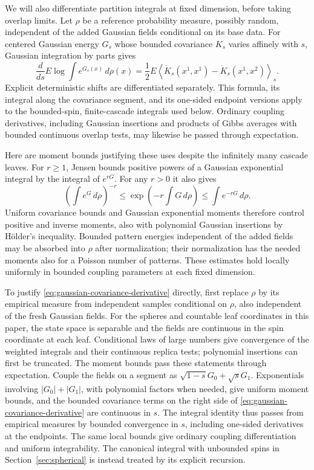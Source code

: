 \documentclass[11pt]{article}
\begin{document}
We will also differentiate partition integrals at fixed dimension, before
taking overlap limits. Let $\rho$ be a reference probability measure,
possibly random, independent of the added Gaussian fields conditional on
its base data. For centered Gaussian energy $G_s$ whose bounded covariance
$K_s$ varies affinely with $s$, Gaussian integration by parts gives
\begin{equation}\label{eq:gaussian-covariance-derivative}
 \frac{d}{ds}E\log\int e^{G_s(x)}\,d\rho(x)
 =\frac12 E\left\langle
       \dot K_s(x^1,x^1)-\dot K_s(x^1,x^2)\right\rangle_s.
\end{equation}
Explicit deterministic shifts are differentiated separately. This formula,
its integral along the covariance segment, and its one-sided endpoint
versions apply to the bounded-spin, finite-cascade integrals used below.
Ordinary coupling derivatives, including Gaussian insertions and products
of Gibbs averages with bounded continuous overlap tests, may likewise
be passed through expectation.

Here are moment bounds justifying these uses despite the infinitely many
cascade leaves. For $r\ge1$, Jensen bounds positive powers of a Gaussian
exponential integral by the integral of $e^{rG}$. For any $r>0$ it also gives
\[
 \left(\int e^G\,d\rho\right)^{-r}
 \le \exp\left(-r\int G\,d\rho\right)
 \le \int e^{-rG}\,d\rho.
\]
Uniform covariance bounds and Gaussian exponential moments therefore
control positive and inverse moments, also with polynomial Gaussian
insertions by H\"older's inequality. Bounded pattern energies independent
of the added fields may be absorbed into $\rho$ after normalization;
their normalization has the needed moments also for a Poisson number of
patterns. These estimates hold locally uniformly in bounded coupling
parameters at each fixed dimension.

To justify \eqref{eq:gaussian-covariance-derivative} directly, first replace
$\rho$ by its empirical measure from independent samples conditional on
$\rho$, also independent of the fresh Gaussian fields. For the spheres
and countable leaf coordinates in this paper, the state space is
separable and the fields are continuous in the spin coordinate at each
leaf. Conditional laws of large numbers give convergence of the weighted
integrals and their continuous replica tests; polynomial insertions can
first be truncated. The moment bounds pass these statements through
expectation. Couple the fields on a segment as
$\sqrt{1-s}G_0+\sqrt{s}G_1$. Exponentials involving
$|G_0|+|G_1|$, with polynomial factors when needed, give uniform moment
bounds, and the bounded covariance terms on the right side of
\eqref{eq:gaussian-covariance-derivative} are continuous in $s$.
The integral identity thus passes from empirical measures by bounded
convergence in $s$, including one-sided derivatives at the endpoints.
The same local bounds give ordinary coupling differentiation and uniform
integrability. The canonical integral with unbounded spins in
Section~\ref{sec:spherical} is instead treated by its explicit recursion.
\end{document}
